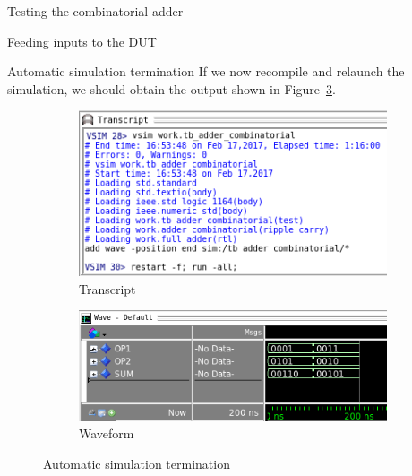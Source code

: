 \documentclass[lab]{course}
\begin{document}
\begin{section}{Testing the combinatorial adder}
\begin{subsection}{Feeding inputs to the DUT}
\begin{subsubsection}{Automatic simulation termination}
            If we now recompile and relaunch the simulation, we should obtain the output shown in Figure~\ref{fig:waveform_combinatorial_process_automatically_terminates}.

            \begin{figure}[!h]
                \centering
                \begin{subfigure}[t]{0.4\textwidth}
                    \centering
                    \includegraphics[width=1.0\textwidth]{figs/waveform_combinatorial_transcript_automatic_termination.png}
                    \caption{Transcript}
                    \label{fig:waveform_combinatorial_transcript_automatically_terminates}
                \end{subfigure}
                \hspace{1em}
                \begin{subfigure}[t]{0.55\textwidth}
                    \centering
                    \includegraphics[width=1.0\textwidth]{figs/waveform_combinatorial_process_automatic_termination.png}
                    \caption{Waveform}
                    \label{fig:waveform_combinatorial_process_automatically_terminates}
                \end{subfigure}
                \caption{Automatic simulation termination}
            \end{figure}
        \end{subsubsection}


\end{subsection}
\end{section}
\end{document}
